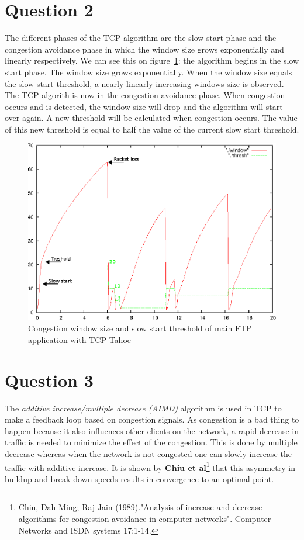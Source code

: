 \documentclass[a4paper]{report}
\begin{document}
\section*{Question 2}
The different phases of the TCP algorithm are the slow start phase and the congestion avoidance phase in which the window size grows exponentially and linearly respectively. We can see this on figure~\ref{ex2:question2}: the algorithm begins in the slow start phase. The window size grows exponentially. When the window size equals the slow start threshold, a nearly linearly increasing windows size is observed. The TCP algorith is now in the congestion avoidance phase. When congestion occurs and is detected, the window size will drop and the algorithm will start over again. A new threshold will be calculated when congestion occurs. The value of this new threshold is equal to half the value of the current slow start threshold.
\begin{figure}[h]
\centerline{\includegraphics{pictures/E2Q2Marked.eps}}
\caption{Congestion window size and slow start threshold of main FTP application with TCP Tahoe}
\label{ex2:question2}
\end{figure}

\section*{Question 3}
The \textit{additive increase/multiple decrease (AIMD)} algorithm is used in TCP to make a feedback loop based on congestion signals. As congestion is a bad thing to happen because it also influences other clients on the network, a rapid decrease in traffic is needed to minimize the effect of the congestion. This is done by multiple decrease whereas when the network is not congested one can slowly increase the traffic with additive increase. It is shown by \textbf{Chiu et al}\footnote{Chiu, Dah-Ming; Raj Jain (1989)."Analysis of increase and decrease algorithms for congestion avoidance in computer networks". Computer Networks and ISDN systems 17:1-14.} that this asymmetry in buildup and break down speeds results in convergence to an optimal point.
\end{document}
